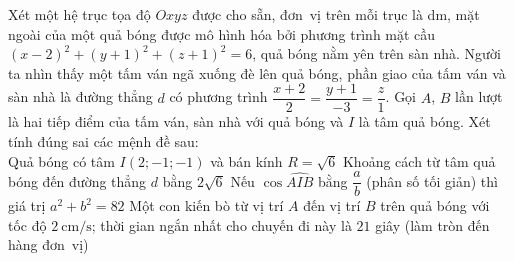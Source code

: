 \begin{ex}%
	Xét một hệ trục tọa độ $Oxyz$ được cho sẵn, đơn~vị trên mỗi trục là dm, mặt ngoài của một quả bóng được mô hình hóa bởi phương trình mặt cầu $\left( x-2 \right)^{2}+\left( y+1 \right)^{2}+\left( z+1 \right)^{2}=6$, quả bóng nằm yên trên sàn nhà. Người ta nhìn thấy một tấm ván ngã xuống đè lên quả bóng, phần giao của tấm ván và sàn nhà là đường thẳng $d$ có phương trình $\dfrac{x+2}{2}=\dfrac{y+1}{-3}=\dfrac{z}{1}$. Gọi $A$, $B$ lần lượt là hai tiếp điểm  của tấm ván, sàn nhà với quả bóng và $I$ là tâm quả bóng.
	Xét  tính đúng sai các mệnh đề sau: \\
	\choiceTF 
		{\True Quả bóng có tâm $I\left( 2;-1;-1\right) $ và bán kính $R=\sqrt{6}$}%
		{Khoảng cách từ tâm quả  bóng đến đường thẳng $d$ bằng $2\sqrt{6}$}%
		{\True Nếu $\cos \widehat{AIB}$ bằng $\dfrac{a}{b}$ (phân số tối giản) thì giá  trị $a^2+b^2=82$}%
		{Một con kiến bò từ vị trí $A$ đến vị trí $B$ trên  quả bóng với tốc độ $2~\mathrm{cm/s}$; thời gian ngắn nhất cho chuyến đi này là $21$ giây (làm tròn đến hàng đơn~vị)}%
\end{ex}
